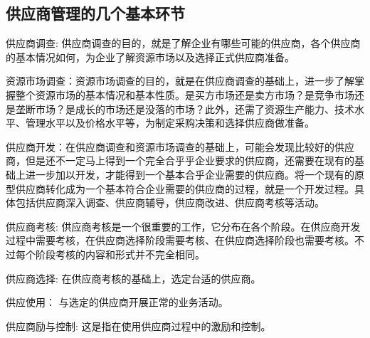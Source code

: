 \subsection {供应商管理的几个基本环节}

    \begin{enumerate.zh}
        \item 供应商调查: 供应商调查的目的，就是了解企业有哪些可能的供应商，各个供应商的基本情况如何，为企业了解资源市场以及选择正式供应商准备。

        \item 资源市场调查：资源市场调查的目的，就是在供应商调查的基础上，进一步了解掌握整个资源市场的基本情况和基本性质。是买方市场还是卖方市场？是竞争市场还是垄断市场？是成长的市场还是没落的市场？此外，还需了资源生产能力、技术水平、管理水平以及价格水平等，为制定采购决策和选择供应商做准备。

        \item 供应商开发：在供应商调查和资源市场调查的基础上，可能会发现比较好的供应商，但是还不一定马上得到一个完全合乎乎企业要求的供应商，还需要在现有的基础上进一步加以开发，才能得到一个基本合乎企业需要的供应商。将一个现有的原型供应商转化成为一个基本符合企业需要的供应商的过程，就是一个开发过程。具体包括供应商深入调查、供应商辅导，供应商改进、供应商考核等活动。

        \item 供应商考核: 供应商考核是一个很重要的工作，它分布在各个阶段。在供应商开发过程中需要考核，在供应商选择阶段需要考核、在供应商选择阶段也需要考核。不过每个阶段考核的内容和形式并不完全相同。

        \item 供应商选择: 在供应商考核的基础上，选定台适的供应商。

       \item 供应使用： 与选定的供应商开展正常的业务活动。

       \item 供应商励与控制: 这是指在使用供应商过程中的激励和控制。
    \end{enumerate.zh}
